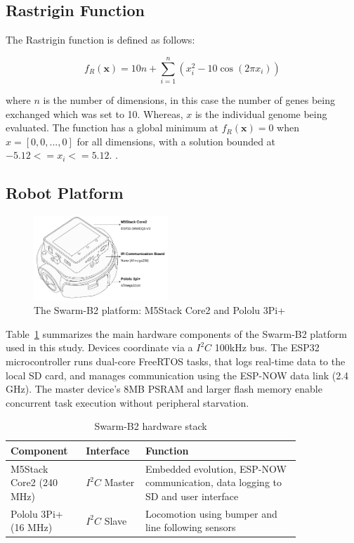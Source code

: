 \documentclass[conference]{IEEEtran}
\begin{document}
\subsection{Rastrigin Function}

The Rastrigin function is defined as follows:

\begin{equation}\label{eq:rastrigin}
f_R(\mathbf{x}) = 10n + \sum_{i=1}^{n} \left(x_i^2 - 10\cos(2\pi x_i)\right)
\end{equation}

where $n$ is the number of dimensions, in this case the number of genes being exchanged which was set to 10. Whereas, $x$ is the individual genome being evaluated. The function has a global minimum at \( f_R(\mathbf{x}) = 0 \) when $x = [0, 0, ..., 0]$ for all dimensions, with a solution bounded at $-5.12<=x_i<=5.12$. \cite{rucinski_impact_2010}.

\subsection{Robot Platform}\label{sec:robot_platform}
\begin{figure}[h]
    \centering
    \includegraphics[width=0.45\textwidth]{B2.pdf}
    \caption{The Swarm-B2 platform: M5Stack Core2 and Pololu 3Pi+}
    \label{fig:B2}
\end{figure}

Table~\ref{tab:B2-hardware} summarizes the main hardware components of the Swarm-B2 platform used in this study. Devices coordinate via a $I^2C$ 100kHz bus. The ESP32 microcontroller runs dual-core FreeRTOS tasks, that logs real-time data to the local SD card, and manages communication using the ESP-NOW data link (2.4 GHz). The master device's 8MB PSRAM and larger flash memory enable concurrent task execution without peripheral starvation. \\

\begin{table}[h]
  \centering
  \caption{Swarm-B2 hardware stack}
  \label{tab:B2-hardware}
  \begin{tabular}{p{0.20\linewidth} p{0.15\linewidth} p{0.47\linewidth}}
    \toprule
    Component & Interface & Function \\
    \midrule
    M5Stack Core2 (240 MHz) & $I^2C$ Master       & Embedded evolution, ESP-NOW communication, data logging to SD and user interface \\
    Pololu 3Pi+ (16 MHz)    & $I^2C$ Slave        & Locomotion using bumper and line following sensors \\
    \bottomrule
  \end{tabular}
\end{table}
\end{document}
